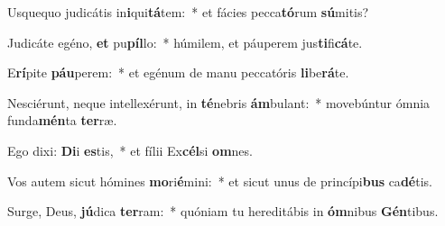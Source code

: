 \item Usquequo judicátis in\textbf{i}qui\textbf{tá}tem:~* et fácies pecca\textbf{tó}rum \textbf{sú}mitis?
\item Judicáte egéno, \textbf{et} pu\textbf{píl}lo:~* húmilem, et páuperem jus\textbf{ti}fi\textbf{cá}te.
\item E\textbf{rí}pite \textbf{páu}perem:~* et egénum de manu peccatóris \textbf{li}be\textbf{rá}te.
\item Nesciérunt, neque intellexérunt, in \textbf{té}nebris \textbf{ám}bulant:~* movebúntur ómnia funda\textbf{mén}ta \textbf{ter}ræ.
\item Ego dixi: \textbf{Di}i \textbf{es}tis,~* et fílii Ex\textbf{cél}si \textbf{om}nes.
\item Vos autem sicut hómines \textbf{mo}ri\textbf{é}mini:~* et sicut unus de princípi\textbf{bus} ca\textbf{dé}tis.
\item Surge, Deus, \textbf{jú}dica \textbf{ter}ram:~* quóniam tu hereditábis in \textbf{óm}nibus \textbf{Gén}tibus.

